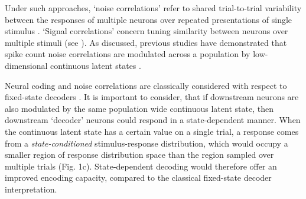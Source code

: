 \documentclass{article}
\begin{document}
Under such approaches, `noise correlations' refer to shared trial-to-trial variability between the responses of multiple neurons over repeated presentations of single stimulus \cite{averbeck2006neural}. `Signal correlations' concern tuning similarity between neurons over multiple stimuli (see \cite{averbeck2006neural}). As discussed, previous studies have demonstrated that spike count noise correlations are modulated across a population  by low-dimensional continuous latent states \cite{lin2015nature}. 

Neural coding and noise correlations are classically considered with respect to fixed-state decoders \cite{averbeck2006neural, moreno2014information, stringer2019high}. It is important to consider, that if downstream neurons are also modulated by the same population wide continuous latent state, then downstream `decoder' neurons could respond in a state-dependent manner.
When the continuous latent state has a certain value on a single trial, a response comes from a \textit{state-conditioned} stimulus-response distribution, which would occupy a smaller region of response distribution space than the region sampled over multiple trials (Fig. 1c). State-dependent decoding would therefore offer an improved encoding capacity, compared to the classical fixed-state decoder interpretation.



\end{document}
